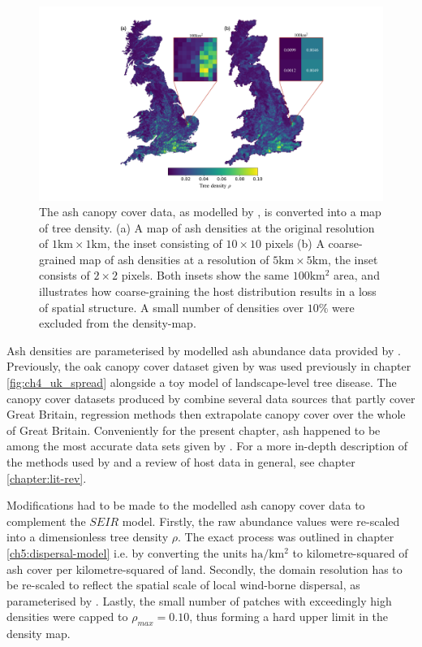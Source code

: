 \begin{figure}
    \centering
    \includegraphics[scale=0.45]{chapter6/figures/fig-ash-data.pdf}
    \caption{The ash canopy cover data, as modelled by \cite{hill.data}, is converted into a map of tree density. (a) A map of ash densities at the original resolution of $1\mathrm{km} \times 1\mathrm{km}$, the inset consisting of $10\times 10$ pixels (b) A coarse-grained map of ash densities at a resolution of $5\mathrm{km} \times 5\mathrm{km}$, the inset consists of $2 \times 2$ pixels. Both insets show the same $100\mathrm{km^2}$ area, and illustrates how coarse-graining the host distribution results in a loss of spatial structure. A small number of densities over $10\%$ were excluded from the density-map.}
    \label{fig:ash-host-data}
\end{figure}

Ash densities are parameterised by modelled ash abundance data provided by \cite{hill.data}. 
Previously, the oak canopy cover dataset given by \cite{hill.data} was used previously in chapter \ref{fig:ch4_uk_spread} alongside a toy model of landscape-level tree disease.
The canopy cover datasets produced by \cite{hill.data} combine several data sources that partly cover Great Britain, 
regression methods then extrapolate canopy cover over the whole of Great Britain.
Conveniently for the present chapter, ash happened to be among the most accurate data sets given by \cite{hill.data}. 
For a more in-depth description of the methods used by \cite{hill.data} and a review of host data in general, see chapter \ref{chapter:lit-rev}.

Modifications had to be made to the modelled ash canopy cover data to complement the $SEIR$ model. 
Firstly, the raw abundance values were re-scaled into a dimensionless tree density $\rho$. 
The exact process was outlined in chapter \ref{ch5:dispersal-model} 
i.e. by converting the units $\mathrm{ha/km^2}$ to kilometre-squared of ash cover per kilometre-squared of land. Secondly, 
the domain resolution has to be re-scaled to reflect the spatial scale of local wind-borne dispersal, as parameterised by \cite{grosdidier2018tracking}.
Lastly, the small number of patches with exceedingly high densities were capped to $\rho_{max} = 0.10$, thus forming a hard upper limit in the density map.

